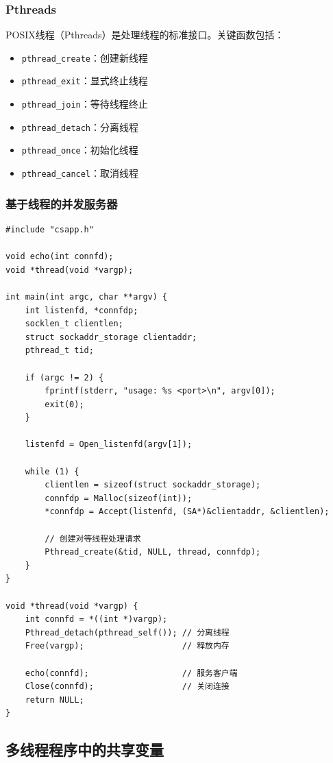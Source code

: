 \subsubsection{Pthreads}
POSIX线程（Pthreads）是处理线程的标准接口。关键函数包括：
\begin{itemize}
    \item \texttt{pthread\_create}：创建新线程
    \item \texttt{pthread\_exit}：显式终止线程
    \item \texttt{pthread\_join}：等待线程终止
    \item \texttt{pthread\_detach}：分离线程
    \item \texttt{pthread\_once}：初始化线程
    \item \texttt{pthread\_cancel}：取消线程
\end{itemize}

\subsubsection{基于线程的并发服务器}
\begin{lstlisting}[style=CStyle]
#include "csapp.h"

void echo(int connfd);
void *thread(void *vargp);

int main(int argc, char **argv) {
    int listenfd, *connfdp;
    socklen_t clientlen;
    struct sockaddr_storage clientaddr;
    pthread_t tid;
    
    if (argc != 2) {
        fprintf(stderr, "usage: %s <port>\n", argv[0]);
        exit(0);
    }
    
    listenfd = Open_listenfd(argv[1]);
    
    while (1) {
        clientlen = sizeof(struct sockaddr_storage);
        connfdp = Malloc(sizeof(int));
        *connfdp = Accept(listenfd, (SA*)&clientaddr, &clientlen);
        
        // 创建对等线程处理请求
        Pthread_create(&tid, NULL, thread, connfdp);
    }
}

void *thread(void *vargp) {
    int connfd = *((int *)vargp);
    Pthread_detach(pthread_self()); // 分离线程
    Free(vargp);                    // 释放内存
    
    echo(connfd);                   // 服务客户端
    Close(connfd);                  // 关闭连接
    return NULL;
}
\end{lstlisting}

\subsection{多线程程序中的共享变量}

